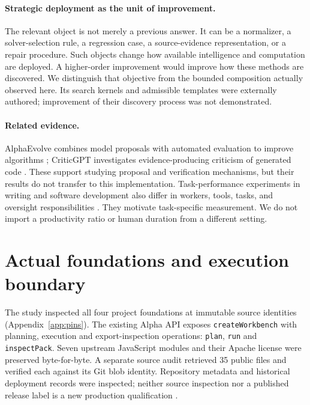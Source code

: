 \paragraph{Strategic deployment as the unit of improvement.} The relevant object is not merely a previous answer. It can be a normalizer, a solver-selection rule, a regression case, a source-evidence representation, or a repair procedure. Such objects change how available intelligence and computation are deployed. A higher-order improvement would improve how these methods are discovered. We distinguish that objective from the bounded composition actually observed here. Its search kernels and admissible templates were externally authored; improvement of their discovery process was not demonstrated.

\paragraph{Related evidence.} AlphaEvolve combines model proposals with automated evaluation to improve algorithms \cite{alphaevolve2025}; CriticGPT investigates evidence-producing criticism of generated code \cite{criticgpt2024}. These support studying proposal and verification mechanisms, but their results do not transfer to this implementation. Task-performance experiments in writing and software development also differ in workers, tools, tasks, and oversight responsibilities \cite{noyzhang2023,becker2025,metrupdate2026}. They motivate task-specific measurement. We do not import a productivity ratio or human duration from a different setting.

\section{Actual foundations and execution boundary}

The study inspected all four project foundations at immutable source identities (Appendix~\ref{app:pins}). The existing Alpha API exposes \texttt{createWorkbench} with planning, execution and export-inspection operations: \texttt{plan}, \texttt{run} and \texttt{inspectPack}. Seven upstream JavaScript modules and their Apache license were preserved byte-for-byte. A separate source audit retrieved 35 public files and verified each against its Git blob identity. Repository metadata and historical deployment records were inspected; neither source inspection nor a published release label is a new production qualification \cite{alphasource,managersource,jobssource,fleetsource}.


